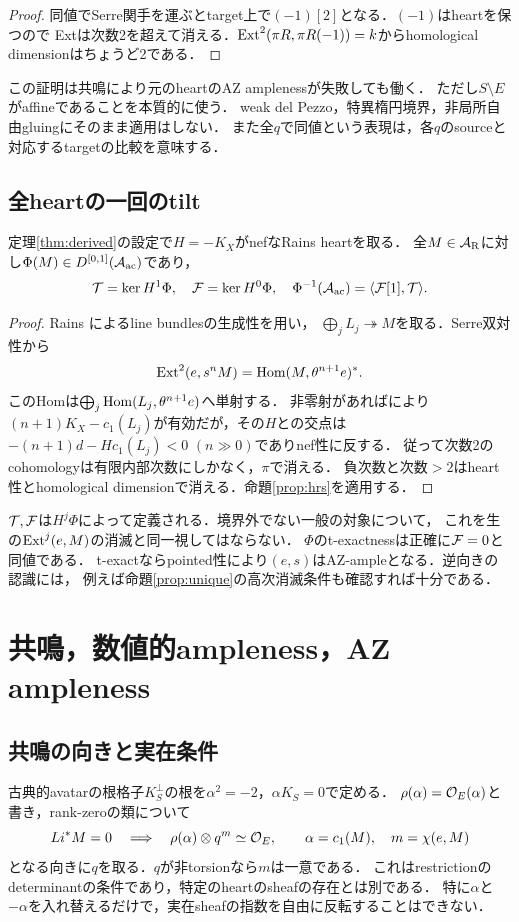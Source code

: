 \begin{proof}
同値でSerre関手を運ぶとtarget上で$(-1)[2]$となる．$(-1)$はheartを保つので
Extは次数2を超えて消える．$\operatorname{Ext}^2(\pi R,\pi R(-1))=k$からhomological dimensionはちょうど2である．
\end{proof}
\begin{remark}
この証明は共鳴により元のheartのAZ amplenessが失敗しても働く．
ただし$S\setminus E$がaffineであることを本質的に使う．
weak del Pezzo，特異楕円境界，非局所自由gluingにそのまま適用はしない．
また全$q$で同値という表現は，各$q$のsourceと対応するtargetの比較を意味する．
\end{remark}

\subsection{全heartの一回のtilt}
\begin{theorem}\label{thm:globaltilt}
定理\ref{thm:derived}の設定で$H=-K_X$がnefなRains heartを取る．
全$M\in\mathcal A_{\mathrm R}$に対し$\Phi(M)\in D^{[0,1]}(\mathcal A_{\mathrm{ac}})$であり，
\[
\mathcal T=\ker H^1\Phi,\quad\mathcal F=\ker H^0\Phi,\quad
\Phi^{-1}(\mathcal A_{\mathrm{ac}})=\langle\mathcal F[1],\mathcal T\rangle.
\]
\end{theorem}
\begin{proof}
Rains \cite[Theorem 9.10]{Rains}によるline bundlesの生成性を用い，
$\bigoplus_j L_j\twoheadrightarrow M$を取る．Serre双対性から
\[
\operatorname{Ext}^2(e,s^nM)=\operatorname{Hom}(M,\theta^{n+1}e)^*.
\]
このHomは$\bigoplus_j\operatorname{Hom}(L_j,\theta^{n+1}e)$へ単射する．
非零射があれば\cite[Corollary 10.12]{Rains}により
$(n+1)K_X-c_1(L_j)$が有効だが，その$H$との交点は
$-(n+1)d-Hc_1(L_j)<0$ $(n\gg0)$でありnef性に反する．
従って次数2のcohomologyは有限内部次数にしかなく，$\pi$で消える．
負次数と次数$>2$はheart性とhomological dimensionで消える．命題\ref{prop:hrs}を適用する．
\end{proof}
\begin{remark}
$\mathcal T,\mathcal F$は$H^j\Phi$によって定義される．境界外でない一般の対象について，
これを生の$\operatorname{Ext}^j(e,M)$の消滅と同一視してはならない．
$\Phi$のt-exactnessは正確に$\mathcal F=0$と同値である．
t-exactならpointed性により$(e,s)$はAZ-ampleとなる．逆向きの認識には，
例えば命題\ref{prop:unique}の高次消滅条件も確認すれば十分である．
\end{remark}

\section{共鳴，数値的ampleness，AZ ampleness}\label{sec:resonance}
\subsection{共鳴の向きと実在条件}
古典的avatarの根格子$K_S^\perp$の根を$\alpha^2=-2$，$\alpha K_S=0$で定める．
$\rho(\alpha)=\mathcal O_E(\alpha)$と書き，rank-zeroの類について
\begin{equation}\label{eq:resonance}
Li^*M=0\quad\Longrightarrow\quad \rho(\alpha)\otimes q^m\simeq\mathcal O_E,
\qquad\alpha=c_1(M),\quad m=\chi(e,M)
\end{equation}
となる向きに$q$を取る．$q$が非torsionなら$m$は一意である．
これはrestrictionのdeterminantの条件であり，特定のheartのsheafの存在とは別である．
特に$\alpha$と$-\alpha$を入れ替えるだけで，実在sheafの指数を自由に反転することはできない．

